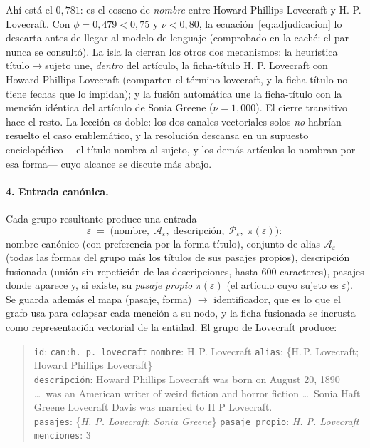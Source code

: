 \documentclass[11pt,a4paper]{article}
\begin{document}
Ahí está el $0{,}781$: es el coseno de \emph{nombre} entre \guillemotleft{}Howard Phillips
Lovecraft\guillemotright{} y \guillemotleft{}H. P. Lovecraft\guillemotright{}. Con $\phi = 0{,}479 < 0{,}75$ y
$\nu < 0{,}80$, la ecuación~\eqref{eq:adjudicacion} lo descarta antes de
llegar al modelo de lenguaje (comprobado en la caché: el par nunca se
consultó). La isla la cierran los otros dos mecanismos: la heurística
título$\to$sujeto une, \emph{dentro} del artículo, la ficha-título
\guillemotleft{}H. P. Lovecraft\guillemotright{} con \guillemotleft{}Howard Phillips Lovecraft\guillemotright{} (comparten el término
\guillemotleft{}lovecraft\guillemotright{}, y la ficha-título no tiene fechas que lo impidan); y la
fusión automática une la ficha-título con la mención idéntica del artículo
de Sonia Greene ($\nu = 1{,}000$). El cierre transitivo hace el resto. La
lección es doble: los dos canales vectoriales solos \emph{no} habrían
resuelto el caso emblemático, y la resolución descansa en un supuesto
enciclopédico ---el título nombra al sujeto, y los demás artículos lo
nombran por esa forma--- cuyo alcance se discute más abajo.

\paragraph{4. Entrada canónica.}
Cada grupo resultante produce una entrada
\[
\varepsilon \;=\; \bigl(\text{nombre},\; \mathcal{A}_\varepsilon,\;
\text{descripción},\; \mathcal{P}_\varepsilon,\; \pi(\varepsilon)\bigr):
\]
nombre canónico (con preferencia por la forma-título), conjunto de alias
$\mathcal{A}_\varepsilon$ (todas las formas del grupo más los títulos de
sus pasajes propios), descripción fusionada (unión sin repetición de las
descripciones, hasta 600 caracteres), pasajes donde aparece y, si existe,
su \emph{pasaje propio} $\pi(\varepsilon)$ (el artículo cuyo sujeto es
$\varepsilon$). Se guarda además el mapa (pasaje, forma) $\to$
identificador, que es lo que el grafo usa para colapsar cada mención a su
nodo, y la ficha fusionada se incrusta como representación vectorial de la
entidad. El grupo de Lovecraft produce:

\begin{quote}\small
\texttt{id}: \texttt{can:h. p. lovecraft} \quad
\texttt{nombre}: H.\,P. Lovecraft \quad
\texttt{alias}: \{H.\,P. Lovecraft; Howard Phillips Lovecraft\}\\
\texttt{descripción}: \guillemotleft{}Howard Phillips Lovecraft was born on August 20,
1890 \dots\ was an American writer of weird fiction and horror fiction
\dots\ Sonia Haft Greene Lovecraft Davis was married to H P Lovecraft.\guillemotright{}\\
\texttt{pasajes}: \{\emph{H. P. Lovecraft}; \emph{Sonia Greene}\} \quad
\texttt{pasaje propio}: \emph{H. P. Lovecraft} \quad
\texttt{menciones}: 3
\end{quote}
\end{document}
